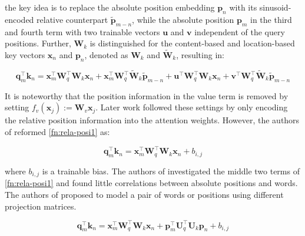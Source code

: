 the key idea is to replace the absolute position embedding ${\boldsymbol p}_n$ with its sinusoid-encoded relative counterpart $\tilde{{\boldsymbol p}}_{m-n}$, while the absolute position ${\boldsymbol p}_m$ in the third and fourth term with two trainable vectors $\mathbf{u}$ and $\mathbf{v}$ independent of the query positions. Further, ${\boldsymbol W}_k$ is distinguished for the content-based and location-based key vectors ${\boldsymbol x}_n$ and ${\boldsymbol p}_n$, denoted as ${\boldsymbol W}_k$ and $\widetilde{{\boldsymbol W}}_k$, resulting in:

\begin{equation}
	{\boldsymbol q}_m^{\intercal}{\boldsymbol k}_n={\boldsymbol x}_m^{\intercal}{\boldsymbol W}_q^{\intercal}{\boldsymbol W}_k{\boldsymbol x}_n+{\boldsymbol x}_m^{\intercal}{\boldsymbol W}_q^{\intercal}\widetilde{{\boldsymbol W}}_k\tilde{{\boldsymbol p}}_{m-n}+\mathbf{u}^{\intercal}{\boldsymbol W}_q^{\intercal}{\boldsymbol W}_k{\boldsymbol x}_n+\mathbf{v}^{\intercal}{\boldsymbol W}_q^{\intercal}\widetilde{{\boldsymbol W}}_k\tilde{{\boldsymbol p}}_{m-n}
	\label{fn:rela-posi2}
\end{equation}

It is noteworthy that the position information in the value term is removed by setting $f_v({\boldsymbol x}_j):={\boldsymbol W}_{v}{\boldsymbol x}_j$. Later work \cite{Raffel2020ExploringTL,He2020DeBERTaDB,Ke2020RethinkingPE,huang-etal-2020-improve} followed these settings by only encoding the relative position information into the attention weights. However, the authors of \cite{Raffel2020ExploringTL} reformed \ref{fn:rela-posi1} as:

\begin{equation}
	{\boldsymbol q}_m^{\intercal}{\boldsymbol k}_n={\boldsymbol x}_m^{\intercal}{\boldsymbol W}_q^{\intercal}{\boldsymbol W}_k{\boldsymbol x}_n + b_{i,j}
	\label{fn:rela-posi3}
\end{equation}

where $b_{i,j}$ is a trainable bias. The authors of \cite{Ke2020RethinkingPE} investigated the middle two terms of \ref{fn:rela-posi1} and found little correlations between absolute positions and words. The authors of \cite{Raffel2020ExploringTL} proposed to model a pair of words or positions using different projection matrices.

\begin{equation}
	{\boldsymbol q}_m^{\intercal}{\boldsymbol k}_n={\boldsymbol x}_m^{\intercal}{\boldsymbol W}_q^{\intercal}{\boldsymbol W}_k{\boldsymbol x}_n +{\boldsymbol p}_m^{\intercal}\mathbf{U}_q^{\intercal}\mathbf{U}_k{\boldsymbol p}_n+b_{i,j}
	\label{fn:rela-posi4}
\end{equation}

